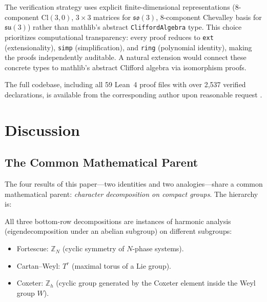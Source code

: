 \documentclass[11pt]{article}
\newcommand{\so}{\mathfrak{so}}
\newcommand{\su}{\mathfrak{su}}
\newcommand{\Cl}{\mathrm{Cl}}
\newcommand{\ZZ}{\mathbb{Z}}
\begin{document}
The verification strategy uses explicit finite-dimensional
representations (8-component $\Cl(3,0)$, $3 \times 3$ matrices for
$\so(3)$, 8-component Chevalley basis for $\su(3)$) rather than
mathlib's abstract \texttt{CliffordAlgebra} type. This choice
prioritizes computational transparency: every proof reduces to
\texttt{ext} (extensionality), \texttt{simp} (simplification), and
\texttt{ring} (polynomial identity), making the proofs independently
auditable. A natural extension would connect these concrete types to
mathlib's abstract Clifford algebra via isomorphism proofs.

The full codebase, including all 59 Lean~4 proof files with
over 2,537 verified declarations, is available from the
corresponding author upon reasonable request \cite{uft-github}.

\section{Discussion}
\label{sec:discussion}

\subsection{The Common Mathematical Parent}

The four results of this paper---two identities and two
analogies---share a common mathematical parent: \emph{character
decomposition on compact groups}. The hierarchy is:

\begin{center}
\end{center}

All three bottom-row decompositions are instances of harmonic analysis
(eigendecomposition under an abelian subgroup) on different subgroups:
\begin{itemize}[leftmargin=*]
\item Fortescue: $\ZZ_N$ (cyclic symmetry of $N$-phase systems).
\item Cartan--Weyl: $T^r$ (maximal torus of a Lie group).
\item Coxeter: $\ZZ_h$ (cyclic group generated by the Coxeter element
  inside the Weyl group $W$).
\end{itemize}
\end{document}
